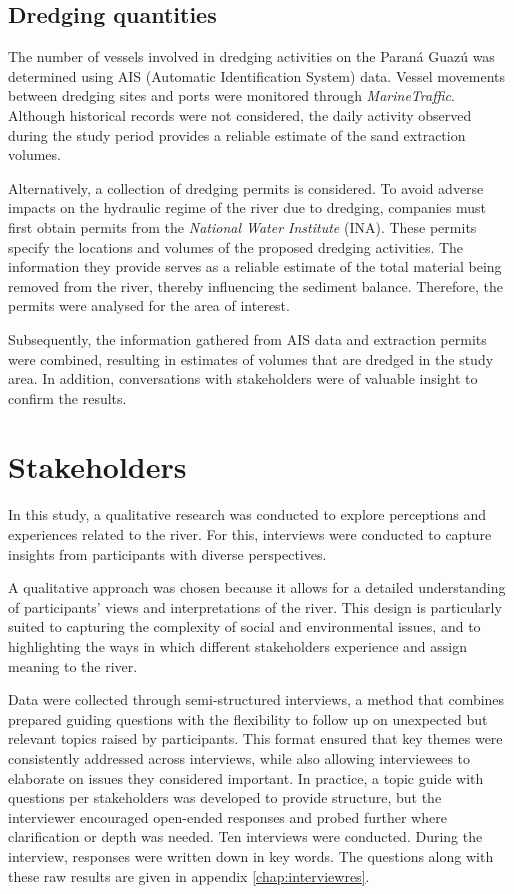 \subsection{Dredging quantities}
The number of vessels involved in dredging activities on the Paraná Guazú was determined using AIS (Automatic Identification System) data. Vessel movements between dredging sites and ports were monitored through \textit{MarineTraffic}. Although historical records were not considered, the daily activity observed during the study period provides a reliable estimate of the sand extraction volumes. 

Alternatively, a collection of dredging permits is considered. To avoid adverse impacts on the hydraulic regime of the river due to dredging, companies must first obtain permits from the \textit{National Water Institute }(INA). These permits specify the locations and volumes of the proposed dredging activities. The information they provide serves as a reliable estimate of the total material being removed from the river, thereby influencing the sediment balance. Therefore, the permits were analysed for the area of interest.

Subsequently, the information gathered from AIS data and extraction permits were combined, resulting in estimates of volumes that are dredged in the study area. In addition, conversations with stakeholders were of valuable insight to confirm the results. 

\section{Stakeholders}
In this study, a qualitative research was conducted to explore perceptions and experiences related to the river. For this, interviews were conducted to capture insights from participants with diverse perspectives.

A qualitative approach was chosen because it allows for a detailed understanding of participants’ views and interpretations of the river. This design is particularly suited to capturing the complexity of social and environmental issues, and to highlighting the ways in which different stakeholders experience and assign meaning to the river.

Data were collected through semi-structured interviews, a method that combines prepared guiding questions with the flexibility to follow up on unexpected but relevant topics raised by participants. This format ensured that key themes were consistently addressed across interviews, while also allowing interviewees to elaborate on issues they considered important. In practice, a topic guide with questions per stakeholders was developed to provide structure, but the interviewer encouraged open-ended responses and probed further where clarification or depth was needed. Ten interviews were conducted. During the interview, responses were written down in key words. The questions along with these raw results are given in appendix \ref{chap:interviewres}.

